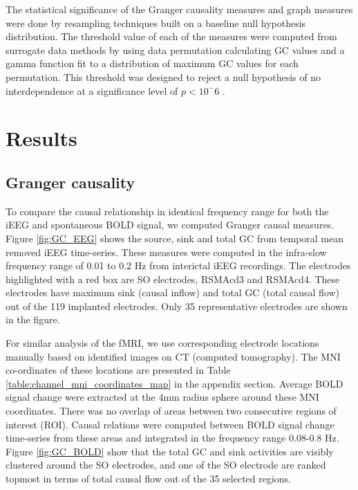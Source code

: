 The statistical significance of the Granger causality measures and graph measures were done by resampling techniques built on a baseline null hypothesis distribution. The threshold value of each of the measures were computed from surrogate data methods by using data permutation calculating GC values and a gamma function fit to a distribution of maximum GC values for each permutation. This threshold was designed to reject a null hypothesis of no interdependence at a significance level of $p<10^-6$ \citep{adhikari2013localizing}.


\section{Results}
\label{sec:results}

\subsection{Granger causality}
To compare the causal relationship in identical frequency range for both the iEEG and spontaneous BOLD signal, we computed Granger causal measures. Figure \ref{fig:GC_EEG} shows the source, sink and total GC from temporal mean removed iEEG time-series. These measures were computed in the infra-slow frequency range of 0.01 to 0.2 Hz from interictal iEEG recordings.  The electrodes highlighted with a red box are SO electrodes, RSMAcd3 and RSMAcd4. These electrodes have maximum sink (causal inflow) and total GC (total causal flow) out of the 119 implanted electrodes. Only 35 representative electrodes are shown in the figure.

For similar analysis of the fMRI, we use corresponding electrode locations manually based on identified images on CT (computed tomography). The MNI co-ordinates of these locations are presented in Table \ref{table:channel_mni_coordinates_map} in the appendix section. Average BOLD signal change were extracted at the 4mm radius sphere around these MNI coordinates. There was no overlap of areas between two consecutive regions of interest (ROI). Causal relations were computed between BOLD signal change time-series from these areas and integrated in the frequency range 0.08-0.8 Hz. Figure \ref{fig:GC_BOLD} show that the total GC and sink activities are visibly clustered around the SO electrodes, and one of the SO electrode are ranked topmost in terms of total causal flow out of the 35 selected regions.

